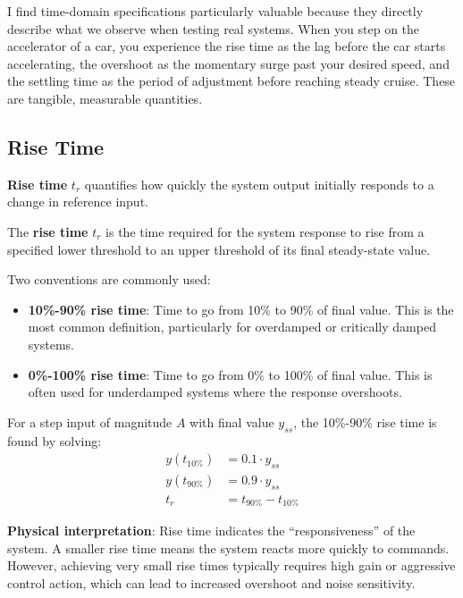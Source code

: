 I find time-domain specifications particularly valuable because they directly describe what we observe when testing real systems. When you step on the accelerator of a car, you experience the rise time as the lag before the car starts accelerating, the overshoot as the momentary surge past your desired speed, and the settling time as the period of adjustment before reaching steady cruise. These are tangible, measurable quantities.

\subsection{Rise Time}
\label{subsec:rise_time}

\textbf{Rise time} $t_r$ quantifies how quickly the system output initially responds to a change in reference input.

\begin{definition}
The \textbf{rise time} $t_r$ is the time required for the system response to rise from a specified lower threshold to an upper threshold of its final steady-state value.
\end{definition}

Two conventions are commonly used:
\begin{itemize}
    \item \textbf{10\%-90\% rise time}: Time to go from 10\% to 90\% of final value. This is the most common definition, particularly for overdamped or critically damped systems.
    \item \textbf{0\%-100\% rise time}: Time to go from 0\% to 100\% of final value. This is often used for underdamped systems where the response overshoots.
\end{itemize}

For a step input of magnitude $A$ with final value $y_{ss}$, the 10\%-90\% rise time is found by solving:
\begin{align}
    y(t_{10\%}) &= 0.1 \cdot y_{ss} \\
    y(t_{90\%}) &= 0.9 \cdot y_{ss} \\
    t_r &= t_{90\%} - t_{10\%}
\end{align}

\textbf{Physical interpretation}: Rise time indicates the ``responsiveness'' of the system. A smaller rise time means the system reacts more quickly to commands. However, achieving very small rise times typically requires high gain or aggressive control action, which can lead to increased overshoot and noise sensitivity.

